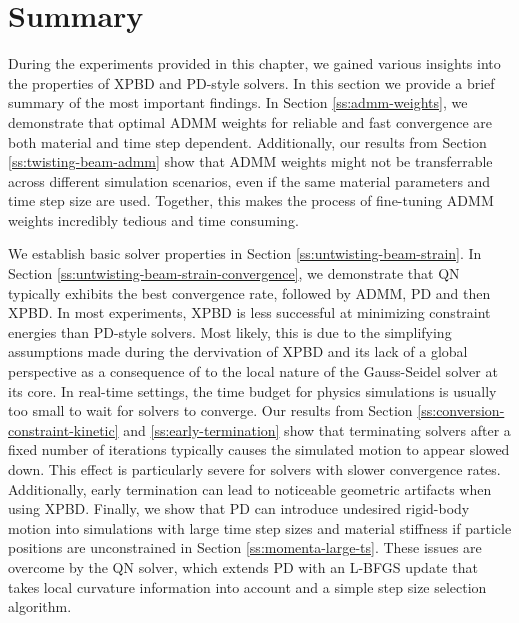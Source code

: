 \section{Summary}\label{s:summary}
During the experiments provided in this chapter, we gained various insights into the properties of XPBD and PD-style solvers. In this section we provide a brief summary of 
the most important findings. In Section \ref{ss:admm-weights}, we demonstrate that optimal ADMM weights for reliable and fast convergence are both material and time step 
dependent. 
Additionally, our results from Section \ref{ss:twisting-beam-admm} show that ADMM weights might not be transferrable across different simulation scenarios, even if the same 
material parameters and time step size are used. Together, this makes the process of fine-tuning ADMM weights incredibly tedious and time consuming. 

We establish basic solver properties in Section \ref{ss:untwisting-beam-strain}.  In Section \ref{ss:untwisting-beam-strain-convergence}, we demonstrate that QN typically 
exhibits the best convergence rate, followed by ADMM, PD and then XPBD. In most experiments, XPBD is less successful at minimizing constraint energies than PD-style solvers.
Most likely, this is due to the simplifying assumptions made during the dervivation of XPBD and its lack of a global perspective as a consequence of to the local nature of 
the Gauss-Seidel solver at its core. In real-time settings, the time budget for physics simulations is usually too small to wait for solvers to converge. Our results from Section 
\ref{ss:conversion-constraint-kinetic} and \ref{ss:early-termination} show that terminating solvers after a fixed number of iterations typically causes the simulated motion 
to appear slowed down. This effect is particularly severe for solvers with slower convergence rates. Additionally, early termination can lead to noticeable geometric artifacts 
when using XPBD. Finally, we show that PD can introduce undesired rigid-body motion into simulations with large time step sizes and material stiffness if particle positions 
are unconstrained in Section \ref{ss:momenta-large-ts}. These issues are overcome by the QN solver, which extends PD with an L-BFGS update that takes local curvature information 
into account and a simple step size selection algorithm.

